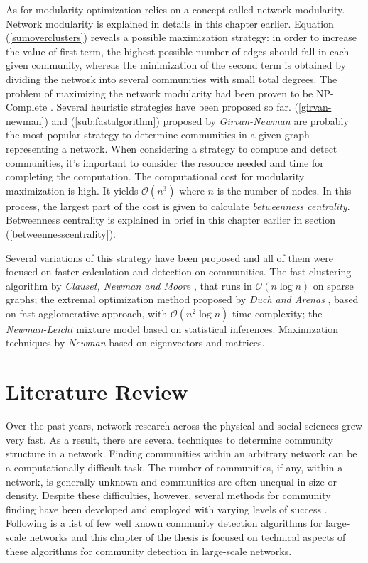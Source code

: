 As for modularity optimization relies on a concept called network modularity. Network modularity is explained in details in this chapter earlier. Equation (\ref{sumoverclusters}) reveals a possible maximization strategy: in order to increase the value of first term, the highest possible number of edges should fall in each given community, whereas the minimization of the second term is obtained by dividing the network into several communities with small total degrees. The problem of maximizing the network modularity had been proven to be NP-Complete \cite{ref-30}. Several heuristic strategies have been proposed so far. (\ref{girvan-newman}) and (\ref{sub:fastalgorithm}) proposed by \textit{Girvan-Newman} are probably the most popular strategy to determine communities in a given graph representing a network. When considering a strategy to compute and detect communities, it's important to consider the resource needed and time for completing the computation. The computational cost for modularity maximization is high. It yields $\mathcal{O}(n^{3})$ where $n$ is the number of nodes. In this process, the largest part of the cost is given to calculate \textit{betweenness centrality}. Betweenness centrality is explained in brief in this chapter earlier in section (\ref{betweennesscentrality}).

Several variations of this strategy have been proposed and all of them were focused on faster calculation and detection on communities. The fast clustering algorithm by \textit{Clauset, Newman and Moore} \cite{ref-31}, that runs in $\mathcal{O}(n \log n)$ on sparse graphs; the extremal optimization method proposed by \textit{Duch and Arenas} \cite{ref-32}, based on fast agglomerative approach, with $\mathcal{O}(n^2 \log n)$ time complexity; the \textit{Newman-Leicht} \cite{ref-33} mixture model based on statistical inferences. Maximization techniques by \textit{Newman} \cite{ref-34} based on eigenvectors and matrices.

\section{Literature Review}\label{sec:literature_review}
Over the past years, network research across the physical and social sciences grew very fast\cite{ref-25}. As a result, there are several techniques to determine community structure in a network. Finding communities within an arbitrary network can be a computationally difficult task. The number of communities, if any, within a network, is generally unknown and communities are often unequal in size or density. Despite these difficulties, however, several methods for community finding have been developed and employed with varying levels of success \cite{ref-2}. Following is a list of few well known community detection algorithms for large-scale networks and this chapter of the thesis is focused on technical aspects of these algorithms for community detection in large-scale networks.

